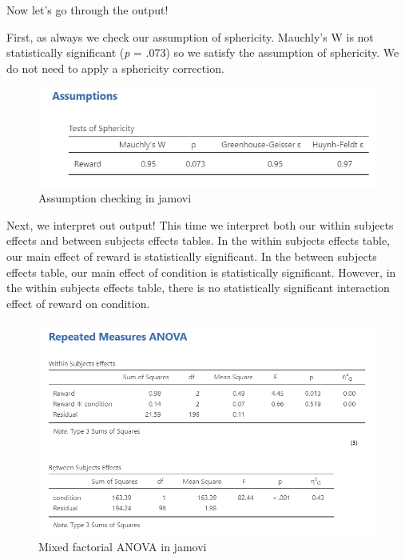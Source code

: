 \documentclass[
]{book}
\begin{document}
Now let's go through the output!

First, as always we check our assumption of sphericity. Mauchly's W is not statistically significant (\emph{p} = .073) so we satisfy the assumption of sphericity. We do not need to apply a sphericity correction.

\begin{figure}

{\centering \includegraphics[width=1\linewidth]{images/06-factorial-anova/mixed_assumptions} 

}

\caption{Assumption checking in jamovi}\label{fig:unnamed-chunk-9}
\end{figure}

Next, we interpret out output! This time we interpret both our within subjects effects and between subjects effects tables. In the within subjects effects table, our main effect of reward is statistically significant. In the between subjects effects table, our main effect of condition is statistically significant. However, in the within subjects effects table, there is no statistically significant interaction effect of reward on condition.

\begin{figure}

{\centering \includegraphics[width=1\linewidth]{images/06-factorial-anova/mixed_results} 

}

\caption{Mixed factorial ANOVA in jamovi}\label{fig:unnamed-chunk-10}
\end{figure}
\end{document}
